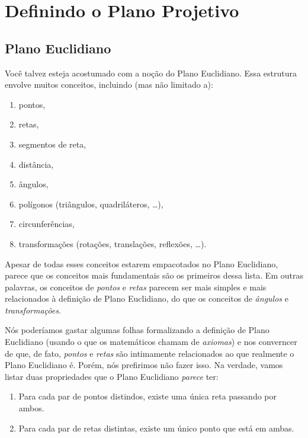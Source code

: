 \chapter{Definindo o Plano Projetivo}

\section{Plano Euclidiano}

Você talvez esteja acostumado com a noção do Plano Euclidiano.
Essa estrutura envolve muitos conceitos, incluindo (mas não limitado a):
\begin{enumerate}[label = \textbullet]
	\item pontos,
	\item retas,
	\item segmentos de reta,
	\item distância,
	\item ângulos,
	\item polígonos (triângulos, quadriláteros, \dots),
	\item circunferências,
	\item transformações (rotações, translações, reflexões, \dots).
\end{enumerate}

Apesar de todas esses conceitos estarem empacotados no Plano Euclidiano, parece que os conceitos mais fundamentais são os primeiros dessa lista.
Em outras palavras, os conceitos de \emph{pontos} e \emph{retas} parecem ser mais simples e mais relacionados à definição de Plano Euclidiano, do que os conceitos de \emph{ângulos} e \emph{transformações}.

Nós poderíamos gastar algumas folhas formalizando a definição de Plano Euclidiano (usando o que os matemáticos chamam de \emph{axiomas}) e nos converncer de que, de fato, \emph{pontos} e \emph{retas} são intimamente relacionados ao que realmente o Plano Euclidiano é.
Porém, nós prefirimos não fazer isso.
Na verdade, vamos listar duas propriedades que o Plano Euclidiano \emph{parece} ter:
\begin{enumerate}[label = (\textit{\roman*})]
	\item Para cada par de pontos distindos, existe uma única reta passando por ambos. \label{item:pe:i}
	\item Para cada par de retas distintas, existe um único ponto que está em ambas. \label{item:pe:ii}
\end{enumerate}

